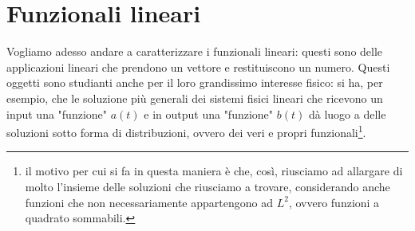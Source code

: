 \chapter{Funzionali lineari}

Vogliamo adesso andare a caratterizzare i funzionali lineari: questi sono delle applicazioni lineari che prendono un vettore e restituiscono un numero. Questi oggetti sono studianti anche per il loro grandissimo interesse fisico: si ha, per esempio, che le soluzione più generali dei sistemi fisici lineari che ricevono
un input una "funzione" $a(t)$ e in output una "funzione" $b(t)$ dà luogo a delle soluzioni sotto forma di distribuzioni, ovvero dei veri e propri funzionali\footnote{il motivo per cui si fa in questa maniera è che, così, riusciamo ad allargare di molto l'insieme delle
soluzioni che riusciamo a trovare, considerando anche funzioni che non necessariamente appartengono ad $L^2$, ovvero funzioni a quadrato sommabili.}.

